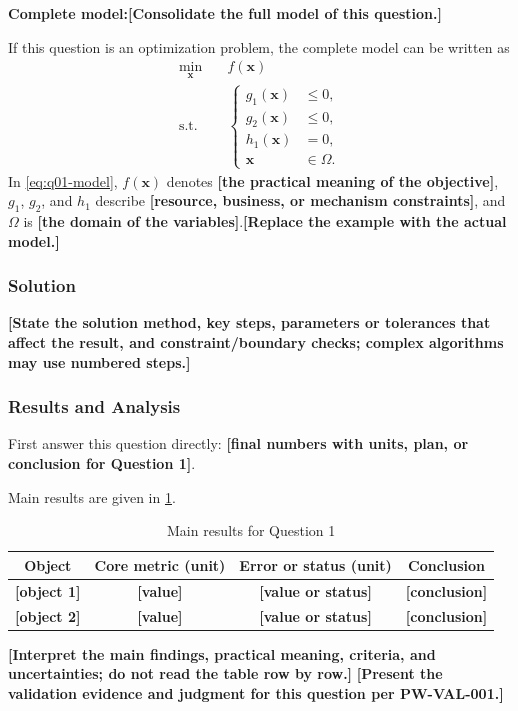 \documentclass[12pt,letterpaper]{article}
\newcommand{\TemplateField}[1]{\textbf{[#1]}}
\begin{document}
\noindent\textbf{Complete model:}\TemplateField{Consolidate the full model of this question.}

If this question is an optimization problem, the complete model can be written as
\begin{equation}
\label{eq:q01-model}
\begin{aligned}
\min_{\symbf{x}}\quad & f(\symbf{x}) \\
\mathrm{s.t.}\quad &
\left\{
\begin{aligned}
g_1(\symbf{x}) &\leq 0,\\
g_2(\symbf{x}) &\leq 0,\\
h_1(\symbf{x}) &= 0,\\
\symbf{x} &\in \Omega .
\end{aligned}
\right.
\end{aligned}
\end{equation}
In \cref{eq:q01-model}, $f(\symbf{x})$ denotes \TemplateField{the practical meaning of the objective}, $g_1$, $g_2$, and $h_1$ describe \TemplateField{resource, business, or mechanism constraints}, and $\Omega$ is \TemplateField{the domain of the variables}.\TemplateField{Replace the example with the actual model.}

\subsubsection{Solution}
\TemplateField{State the solution method, key steps, parameters or tolerances that affect the result, and constraint/boundary checks; complex algorithms may use numbered steps.}

\subsubsection{Results and Analysis}
First answer this question directly: \TemplateField{final numbers with units, plan, or conclusion for Question 1}.

Main results are given in \cref{tab:q01-results}.
\begin{table}[htbp]
  \centering
  \caption{Main results for Question 1}
  \label{tab:q01-results}
  \begin{tabular}{cccc}
    \toprule[1.2pt]
    Object & Core metric (unit) & Error or status (unit) & Conclusion \\
    \midrule[0.8pt]
    \TemplateField{object 1} & \TemplateField{value} & \TemplateField{value or status} & \TemplateField{conclusion} \\
    \TemplateField{object 2} & \TemplateField{value} & \TemplateField{value or status} & \TemplateField{conclusion} \\
    \bottomrule[1.2pt]
  \end{tabular}
\end{table}
\TemplateField{Interpret the main findings, practical meaning, criteria, and uncertainties; do not read the table row by row.}
\TemplateField{Present the validation evidence and judgment for this question per PW-VAL-001.}
\end{document}
